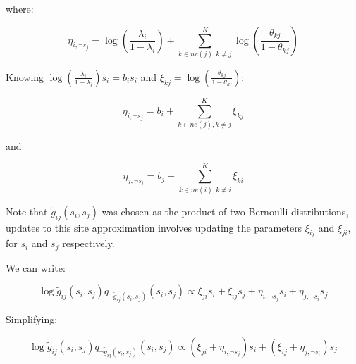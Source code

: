 \documentclass[12pt]{article}
\newcommand\tab[1][1cm]{\hspace*{#1}}
\begin{document}
where:

\[\eta_{i, \neg s_j} =  \log \left(\frac{\lambda_i}{1-\lambda_i}\right) + \sum_{k\in ne(j), k\neq j}^{K} \log\left(\frac{\theta_{kj}}{1-\theta_{kj}} \right)\]

Knowing $\log \left(\frac{\lambda_i}{1-\lambda_i} \right)s_i = b_i s_i$ and $\xi_{kj} = \log\left(\frac{\theta_{kj}}{1-\theta_{kj}} \right)$:

\[\eta_{i, \neg s_j} =  b_i + \sum_{k\in ne(j), k\neq j}^{K} \xi_{kj}\]

and

\[\eta_{j, \neg s_i} =  b_j + \sum_{k\in ne(i), k\neq i}^{K} \xi_{ki}\]


Note that $\tilde{g}_{ij}(s_i, s_j)$ was chosen as the product of two Bernoulli distributions, updates to this site approximation involves updating the  parameters $\xi_{ij}$ and $\xi_{ji}$, for $s_i$ and $s_j$ respectively.

We can write:

\[\log \tilde{g}_{ij}(s_i, s_j)q_{\neg \tilde{g}_{ij}(s_i, s_j)}(s_i, s_j) \propto \xi_{ji} s_i + \xi_{ij} s_j + \eta_{i, \neg s_j} s_i + \eta_{j, \neg s_i} s_j\]

Simplifying:

\[\log \tilde{g}_{ij}(s_i, s_j) q_{\neg \tilde{g}_{ij}(s_i, s_j)}(s_i, s_j) \propto \left(\xi_{ji}+ \eta_{i, \neg s_j} \right) s_i + \left(\xi_{ij} + \eta_{j, \neg s_i} \right) s_j \]

\end{document}
